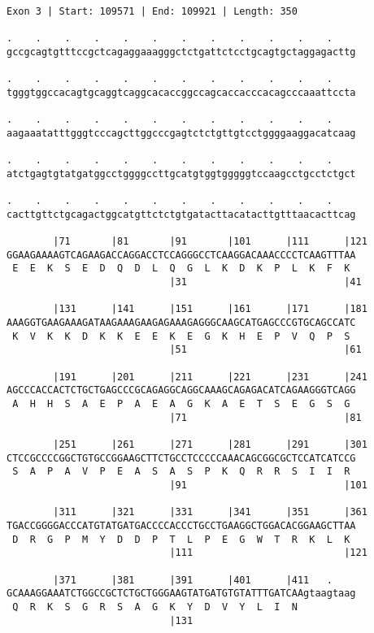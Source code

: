 \documentclass{article}
\begin{document}
\newpage
\begin{Verbatim}
Exon 3 | Start: 109571 | End: 109921 | Length: 350
 
.    .    .    .    .    .    .    .    .    .    .    .    
gccgcagtgtttccgctcagaggaaagggctctgattctcctgcagtgctaggagacttg
  
.    .    .    .    .    .    .    .    .    .    .    .    
tgggtggccacagtgcaggtcaggcacaccggccagcaccacccacagcccaaattccta
  
.    .    .    .    .    .    .    .    .    .    .    .    
aagaaatatttgggtcccagcttggcccgagtctctgttgtcctggggaaggacatcaag
  
.    .    .    .    .    .    .    .    .    .    .    .    
atctgagtgtatgatggcctggggccttgcatgtggtgggggtccaagcctgcctctgct
  
.    .    .    .    .    .    .    .    .    .    .    .    
cacttgttctgcagactggcatgttctctgtgatacttacatacttgtttaacacttcag
  
        |71       |81       |91       |101      |111      |121
GGAAGAAAAGTCAGAAGACCAGGACCTCCAGGGCCTCAAGGACAAACCCCTCAAGTTTAA
 E  E  K  S  E  D  Q  D  L  Q  G  L  K  D  K  P  L  K  F  K 
                            |31                           |41
  
        |131      |141      |151      |161      |171      |181
AAAGGTGAAGAAAGATAAGAAAGAAGAGAAAGAGGGCAAGCATGAGCCCGTGCAGCCATC
 K  V  K  K  D  K  K  E  E  K  E  G  K  H  E  P  V  Q  P  S 
                            |51                           |61
  
        |191      |201      |211      |221      |231      |241
AGCCCACCACTCTGCTGAGCCCGCAGAGGCAGGCAAAGCAGAGACATCAGAAGGGTCAGG
 A  H  H  S  A  E  P  A  E  A  G  K  A  E  T  S  E  G  S  G 
                            |71                           |81
  
        |251      |261      |271      |281      |291      |301
CTCCGCCCCGGCTGTGCCGGAAGCTTCTGCCTCCCCCAAACAGCGGCGCTCCATCATCCG
 S  A  P  A  V  P  E  A  S  A  S  P  K  Q  R  R  S  I  I  R 
                            |91                           |101
  
        |311      |321      |331      |341      |351      |361
TGACCGGGGACCCATGTATGATGACCCCACCCTGCCTGAAGGCTGGACACGGAAGCTTAA
 D  R  G  P  M  Y  D  D  P  T  L  P  E  G  W  T  R  K  L  K 
                            |111                          |121
  
        |371      |381      |391      |401      |411   .    
GCAAAGGAAATCTGGCCGCTCTGCTGGGAAGTATGATGTGTATTTGATCAAgtaagtaag
 Q  R  K  S  G  R  S  A  G  K  Y  D  V  Y  L  I  N          
                            |131                            
  

\end{Verbatim}
\end{document}
